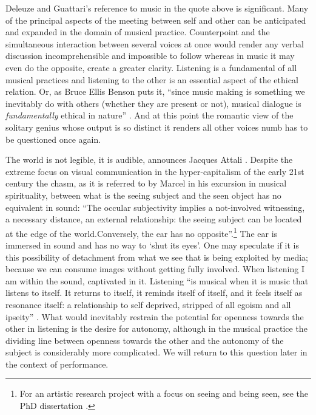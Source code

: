 \documentclass[a4paper]{article}
\begin{document}
Deleuze and Guattari's reference to music in the quote above is significant. Many of the principal aspects of the meeting between self and other can be anticipated and expanded in the domain of musical practice. Counterpoint and the simultaneous interaction between several voices at once would render any verbal discussion incomprehensible and impossible to follow whereas in music it may even do the opposite, create a greater clarity. Listening is a fundamental of all musical practices and listening to the other is an essential aspect of the ethical relation. Or, as Bruce Ellis Benson puts it, ``since music making is something we inevitably do with others (whether they are present or not), musical dialogue is \emph{fundamentally} ethical in nature'' \citep[p. 164]{benson03}. And at this point the romantic view of the solitary genius whose output is so distinct it renders all other voices numb has to be questioned once again.

The world is not legible, it is audible, announces Jacques Attali \citep[p. 3]{attali85}. Despite the extreme focus on visual communication in the hyper-capitalism of the early 21st century the chasm, as it is referred to by Marcel \citet{cobussen08} in his excursion in musical spirituality, between what is the seeing subject and the seen object has no equivalent in sound: ``The occular subjectivity implies a not-involved witnessing, a necessary distance, an external relationship: the seeing subject can be located at the edge of the world.Conversely, the ear has no opposite''.\footnote{For an artistic research project with a focus on seeing and being seen, see the PhD dissertation \citet{leiderstam06}.} The ear is immersed in sound and has no way to `shut its eyes'. One may speculate if it is this possibility of detachment from what we see that is being exploited by media; because we can consume images without getting fully involved. When listening I am within the sound, captivated in it. Listening ``is musical when it is music that listens to itself. It returns to itself, it reminds itself of itself, and it feels itself as resonance itself: a relationship to self deprived, stripped of all egoism and all ipseity'' \citep[p. 67]{nancy2007}. What would inevitably restrain the potential for openness towards the other in listening is the desire for autonomy, although in the musical practice the dividing line between openness towards the other and the autonomy of the subject is considerably more complicated. We will return to this question later in the context of performance.
\end{document}
